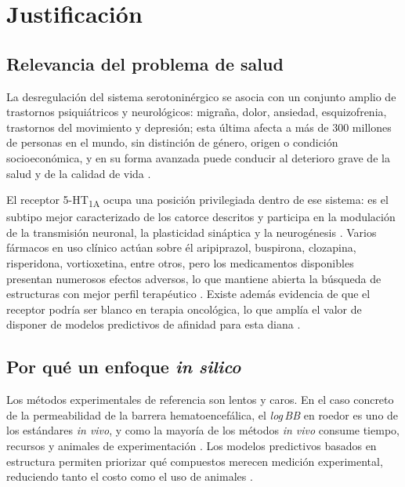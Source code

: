 \section{Justificación}
\label{cap:justificacion}

\subsection{Relevancia del problema de salud}
\label{sec:just-salud}

La desregulación del sistema serotoninérgico se asocia con un conjunto amplio de
trastornos psiquiátricos y neurológicos: migraña, dolor, ansiedad,
esquizofrenia, trastornos del movimiento y depresión; esta última afecta a más
de 300 millones de personas en el mundo, sin distinción de género, origen o
condición socioeconómica, y en su forma avanzada puede conducir al deterioro
grave de la salud y de la calidad de vida \cite{czub_curated_2021}.

El receptor 5-HT\textsubscript{1A} ocupa una posición privilegiada dentro de ese
sistema: es el subtipo mejor caracterizado de los catorce descritos y participa
en la modulación de la transmisión neuronal, la plasticidad sináptica y la
neurogénesis \cite{czub_curated_2021}. Varios fármacos en uso clínico actúan sobre
él aripiprazol, buspirona, clozapina, risperidona, vortioxetina, entre
otros, pero los medicamentos disponibles presentan numerosos efectos
adversos, lo que mantiene abierta la búsqueda de estructuras con mejor perfil
terapéutico \cite{czub_automlbased_2022}. Existe además evidencia de que el receptor
podría ser blanco en terapia oncológica, lo que amplía el valor de disponer de
modelos predictivos de afinidad para esta diana \cite{czub_curated_2021}.

\subsection{Por qué un enfoque \textit{in silico}}
\label{sec:just-insilico}

Los métodos experimentales de referencia son lentos y caros. En el caso concreto
de la permeabilidad de la barrera hematoencefálica, el \textit{log\,BB} en
roedor es uno de los estándares \textit{in vivo}, y como la mayoría de los
métodos \textit{in vivo} consume tiempo, recursos y animales de experimentación
\cite{faramarzi_development_2022}. Los modelos predictivos basados en estructura permiten
priorizar qué compuestos merecen medición experimental, reduciendo tanto el
costo como el uso de animales \cite{faramarzi_development_2022,spielvogel_enhancing_2025a}.


